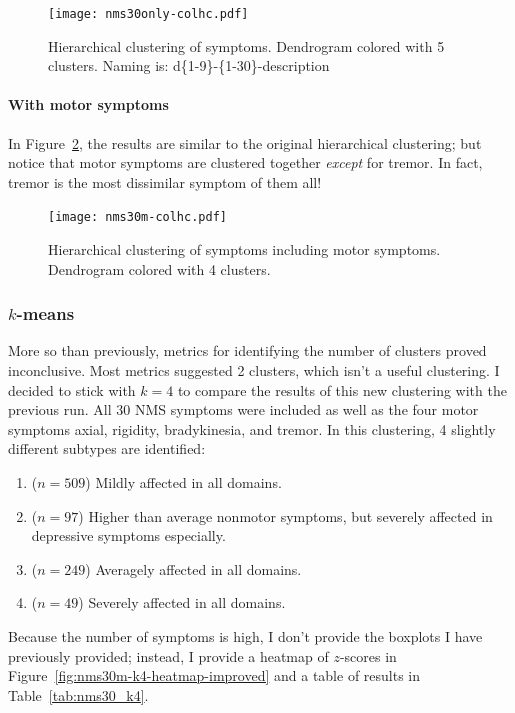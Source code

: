 \documentclass[10pt]{article}
\begin{document}
\begin{multicols}{2}
\begin{figure}[p]
  \centering
  \texttt{[image: nms30only-colhc.pdf]} \caption{Hierarchical clustering of symptoms.
    Dendrogram colored with 5 clusters. Naming is: d\{1-9\}-\{1-30\}-description}
  \label{fig:nms30only-colhc}
\end{figure}

\paragraph{With motor symptoms}

In Figure~\ref{fig:nms30m-colhc}, the results are similar to the original hierarchical
clustering; but notice that motor symptoms are clustered together \emph{except} for tremor. In
fact, tremor is the most dissimilar symptom of them all!

\begin{figure}[p]
  \centering
  \texttt{[image: nms30m-colhc.pdf]} \caption{Hierarchical clustering of symptoms
  including motor symptoms.  Dendrogram colored with 4 clusters.}
  \label{fig:nms30m-colhc}
\end{figure}

\subsubsection{$k$-means}

More so than previously, metrics for identifying the number of clusters proved inconclusive. Most
metrics suggested 2 clusters, which isn't a useful clustering. I decided to stick with $k = 4$ to
compare the results of this new clustering with the previous run. All 30 NMS symptoms were included
as well as the four motor symptoms axial, rigidity, bradykinesia, and tremor.
In this clustering, 4 slightly different subtypes are identified:

\begin{enumerate}
  \item ($n = 509$) Mildly affected in all domains.
  \item ($n = 97$) Higher than average nonmotor symptoms, but severely affected in depressive
    symptoms especially.
  \item ($n = 249$) Averagely affected in all domains.
  \item ($n = 49$) Severely affected in all domains.
\end{enumerate}

Because the number of symptoms is high, I don't provide the boxplots I have previously provided;
instead, I provide a heatmap of $z$-scores in Figure~\ref{fig:nms30m-k4-heatmap-improved} and a
table of results in Table~\ref{tab:nms30_k4}.


\end{multicols}
\end{document}
